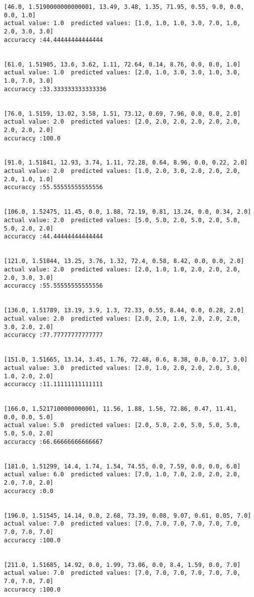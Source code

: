 \documentclass[11pt]{article}
\begin{document}
\begin{Verbatim}[commandchars=\\\{\}]
[46.0, 1.5190000000000001, 13.49, 3.48, 1.35, 71.95, 0.55, 9.0, 0.0, 0.0, 1.0]
actual value: 1.0  predicted values: [1.0, 1.0, 1.0, 3.0, 7.0, 1.0, 2.0, 3.0, 3.0]
accuraccy :44.44444444444444


[61.0, 1.51905, 13.6, 3.62, 1.11, 72.64, 0.14, 8.76, 0.0, 0.0, 1.0]
actual value: 1.0  predicted values: [2.0, 1.0, 3.0, 3.0, 1.0, 3.0, 1.0, 7.0, 3.0]
accuraccy :33.333333333333336


[76.0, 1.5159, 13.02, 3.58, 1.51, 73.12, 0.69, 7.96, 0.0, 0.0, 2.0]
actual value: 2.0  predicted values: [2.0, 2.0, 2.0, 2.0, 2.0, 2.0, 2.0, 2.0, 2.0]
accuraccy :100.0


[91.0, 1.51841, 12.93, 3.74, 1.11, 72.28, 0.64, 8.96, 0.0, 0.22, 2.0]
actual value: 2.0  predicted values: [1.0, 2.0, 3.0, 2.0, 2.0, 2.0, 2.0, 1.0, 1.0]
accuraccy :55.55555555555556


[106.0, 1.52475, 11.45, 0.0, 1.88, 72.19, 0.81, 13.24, 0.0, 0.34, 2.0]
actual value: 2.0  predicted values: [5.0, 5.0, 2.0, 5.0, 2.0, 5.0, 5.0, 2.0, 2.0]
accuraccy :44.44444444444444


[121.0, 1.51844, 13.25, 3.76, 1.32, 72.4, 0.58, 8.42, 0.0, 0.0, 2.0]
actual value: 2.0  predicted values: [2.0, 1.0, 1.0, 2.0, 2.0, 2.0, 2.0, 3.0, 3.0]
accuraccy :55.55555555555556


[136.0, 1.51789, 13.19, 3.9, 1.3, 72.33, 0.55, 8.44, 0.0, 0.28, 2.0]
actual value: 2.0  predicted values: [2.0, 2.0, 1.0, 2.0, 2.0, 2.0, 3.0, 2.0, 2.0]
accuraccy :77.77777777777777


[151.0, 1.51665, 13.14, 3.45, 1.76, 72.48, 0.6, 8.38, 0.0, 0.17, 3.0]
actual value: 3.0  predicted values: [2.0, 1.0, 2.0, 2.0, 2.0, 3.0, 1.0, 2.0, 2.0]
accuraccy :11.11111111111111


[166.0, 1.5217100000000001, 11.56, 1.88, 1.56, 72.86, 0.47, 11.41, 0.0, 0.0, 5.0]
actual value: 5.0  predicted values: [2.0, 5.0, 2.0, 5.0, 5.0, 5.0, 5.0, 5.0, 2.0]
accuraccy :66.66666666666667


[181.0, 1.51299, 14.4, 1.74, 1.54, 74.55, 0.0, 7.59, 0.0, 0.0, 6.0]
actual value: 6.0  predicted values: [7.0, 1.0, 7.0, 2.0, 2.0, 2.0, 2.0, 7.0, 2.0]
accuraccy :0.0


[196.0, 1.51545, 14.14, 0.0, 2.68, 73.39, 0.08, 9.07, 0.61, 0.05, 7.0]
actual value: 7.0  predicted values: [7.0, 7.0, 7.0, 7.0, 7.0, 7.0, 7.0, 7.0, 7.0]
accuraccy :100.0


[211.0, 1.51685, 14.92, 0.0, 1.99, 73.06, 0.0, 8.4, 1.59, 0.0, 7.0]
actual value: 7.0  predicted values: [7.0, 7.0, 7.0, 7.0, 7.0, 7.0, 7.0, 7.0, 7.0]
accuraccy :100.0



\end{Verbatim}
\end{document}
